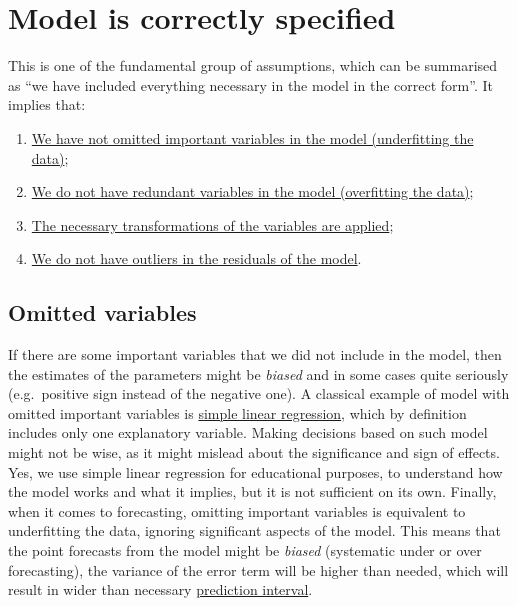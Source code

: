 \documentclass[
]{book}
\providecommand{\tightlist}{%
  \setlength{\itemsep}{0pt}\setlength{\parskip}{0pt}}
\theoremstyle{definition}
\theoremstyle{definition}
\theoremstyle{definition}
\theoremstyle{definition}
\theoremstyle{remark}
\begin{document}
\hypertarget{assumptionsCorrectModel}{%
\section{Model is correctly specified}\label{assumptionsCorrectModel}}

This is one of the fundamental group of assumptions, which can be summarised as ``we have included everything necessary in the model in the correct form''. It implies that:

\begin{enumerate}
\def\labelenumi{\arabic{enumi}.}
\tightlist
\item
  \protect\hyperlink{assumptionsCorrectModelOmitted}{We have not omitted important variables in the model (underfitting the data)};
\item
  \protect\hyperlink{assumptionsCorrectModelRedundant}{We do not have redundant variables in the model (overfitting the data)};
\item
  \protect\hyperlink{assumptionsCorrectModelTransformations}{The necessary transformations of the variables are applied};
\item
  \protect\hyperlink{assumptionsCorrectModelOutliers}{We do not have outliers in the residuals of the model}.
\end{enumerate}

\hypertarget{assumptionsCorrectModelOmitted}{%
\subsection{Omitted variables}\label{assumptionsCorrectModelOmitted}}

If there are some important variables that we did not include in the model, then the estimates of the parameters might be \emph{biased} and in some cases quite seriously (e.g.~positive sign instead of the negative one). A classical example of model with omitted important variables is \protect\hyperlink{simpleLinearRegression}{simple linear regression}, which by definition includes only one explanatory variable. Making decisions based on such model might not be wise, as it might mislead about the significance and sign of effects. Yes, we use simple linear regression for educational purposes, to understand how the model works and what it implies, but it is not sufficient on its own. Finally, when it comes to forecasting, omitting important variables is equivalent to underfitting the data, ignoring significant aspects of the model. This means that the point forecasts from the model might be \emph{biased} (systematic under or over forecasting), the variance of the error term will be higher than needed, which will result in wider than necessary \protect\hyperlink{confidenceIntervalsPrediction}{prediction interval}.
\end{document}
